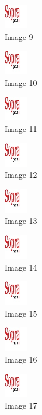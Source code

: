 \begin{figure}[!h]
  \center
  \includegraphics[width=1cm]{img/test.jpg}
  \caption{Image 9}
\end{figure}

\begin{figure}[!h]
  \center
  \includegraphics[width=1cm]{img/test.jpg}
  \caption{Image 10}
\end{figure}

\begin{figure}[!h]
  \center
  \includegraphics[width=1cm]{img/test.jpg}
  \caption{Image 11}
\end{figure}

\begin{figure}[!h]
  \center
  \includegraphics[width=1cm]{img/test.jpg}
  \caption{Image 12}
\end{figure}

\begin{figure}[!h]
  \center
  \includegraphics[width=1cm]{img/test.jpg}
  \caption{Image 13}
\end{figure}

\begin{figure}[!h]
  \center
  \includegraphics[width=1cm]{img/test.jpg}
  \caption{Image 14}
\end{figure}

\begin{figure}[!h]
  \center
  \includegraphics[width=1cm]{img/test.jpg}
  \caption{Image 15}
\end{figure}

\begin{figure}[!h]
  \center
  \includegraphics[width=1cm]{img/test.jpg}
  \caption{Image 16}
\end{figure}

\begin{figure}[!h]
  \center
  \includegraphics[width=1cm]{img/test.jpg}
  \caption{Image 17}
\end{figure}

